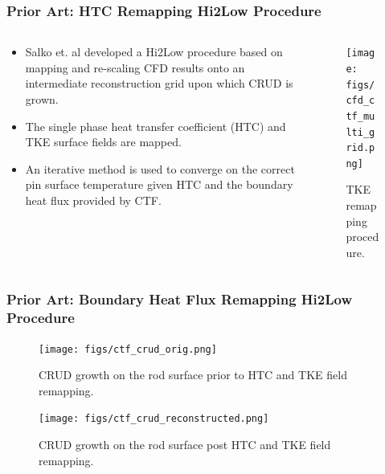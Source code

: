 \documentclass[t, pdftex]{beamer}
\begin{document}
\begin{frame}[shrink=10]
    \frametitle{Prior Art: HTC Remapping Hi2Low Procedure}
\begin{columns}
\begin{column}{0.5\textwidth}
   \begin{itemize}
   \item Salko et. al developed a Hi2Low procedure based on mapping and re-scaling CFD results onto an intermediate reconstruction grid upon which CRUD is grown.
   \item The single phase heat transfer coefficient (HTC) and TKE surface fields are mapped.
   \item An iterative method is used to converge on the correct pin surface temperature given HTC and the boundary heat flux provided by CTF.
   \end{itemize}
\end{column}
\begin{column}{0.5\textwidth}  %
    \begin{center}
    \begin{figure}
     \texttt{[image: figs/cfd\_ctf\_multi\_grid.png]}
     \caption{TKE remapping procedure.}      
    \end{figure}
     \end{center}
\end{column}
\end{columns}
\end{frame}

\begin{frame}
    \frametitle{Prior Art: Boundary Heat Flux Remapping Hi2Low Procedure}
    \begin{figure}[!htbp]
\centering
\begin{minipage}{.5\textwidth}
  \texttt{[image: figs/ctf\_crud\_orig.png]}
\caption{CRUD growth on the rod surface prior to HTC and TKE field remapping.}
\label{fig:crud_pre_map}
\end{minipage}%
\begin{minipage}{.5\textwidth}
  \texttt{[image: figs/ctf\_crud\_reconstructed.png]}
\caption{CRUD growth on the rod surface post HTC and TKE field remapping.}
\label{fig:crud_post_map}
\end{minipage}
\end{figure}
\end{frame}
\end{document}
